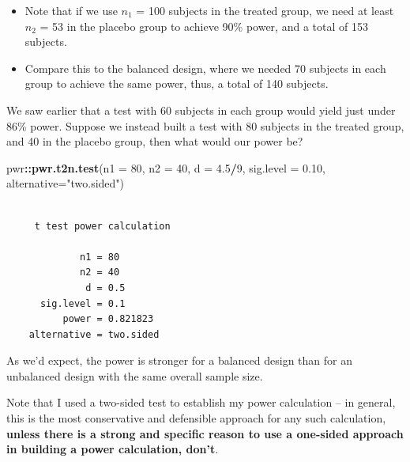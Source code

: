 \documentclass[
]{book}
\newenvironment{Shaded}{\begin{snugshade}}{\end{snugshade}}
\newcommand{\DataTypeTok}[1]{\textcolor[rgb]{0.13,0.29,0.53}{#1}}
\newcommand{\DecValTok}[1]{\textcolor[rgb]{0.00,0.00,0.81}{#1}}
\newcommand{\FloatTok}[1]{\textcolor[rgb]{0.00,0.00,0.81}{#1}}
\newcommand{\KeywordTok}[1]{\textcolor[rgb]{0.13,0.29,0.53}{\textbf{#1}}}
\newcommand{\NormalTok}[1]{#1}
\newcommand{\OperatorTok}[1]{\textcolor[rgb]{0.81,0.36,0.00}{\textbf{#1}}}
\newcommand{\StringTok}[1]{\textcolor[rgb]{0.31,0.60,0.02}{#1}}
\providecommand{\tightlist}{%
  \setlength{\itemsep}{0pt}\setlength{\parskip}{0pt}}
\begin{document}
\begin{itemize}
\tightlist
\item
  Note that if we use \(n_1\) = 100 subjects in the treated group, we need at least \(n_2\) = 53 in the placebo group to achieve 90\% power, and a total of 153 subjects.
\item
  Compare this to the balanced design, where we needed 70 subjects in each group to achieve the same power, thus, a total of 140 subjects.
\end{itemize}

We saw earlier that a test with 60 subjects in each group would yield just under 86\% power. Suppose we instead built a test with 80 subjects in the treated group, and 40 in the placebo group, then what would our power be?

\begin{Shaded}
\begin{Highlighting}[]
\NormalTok{pwr}\OperatorTok{::}\KeywordTok{pwr.t2n.test}\NormalTok{(}\DataTypeTok{n1 =} \DecValTok{80}\NormalTok{, }\DataTypeTok{n2 =} \DecValTok{40}\NormalTok{, }\DataTypeTok{d =} \FloatTok{4.5}\OperatorTok{/}\DecValTok{9}\NormalTok{, }
             \DataTypeTok{sig.level =} \FloatTok{0.10}\NormalTok{,}
             \DataTypeTok{alternative=}\StringTok{"two.sided"}\NormalTok{)}
\end{Highlighting}
\end{Shaded}

\begin{verbatim}

     t test power calculation 

             n1 = 80
             n2 = 40
              d = 0.5
      sig.level = 0.1
          power = 0.821823
    alternative = two.sided
\end{verbatim}

As we'd expect, the power is stronger for a balanced design than for an unbalanced design with the same overall sample size.

Note that I used a two-sided test to establish my power calculation -- in general, this is the most conservative and defensible approach for any such calculation, \textbf{unless there is a strong and specific reason to use a one-sided approach in building a power calculation, don't}.

  
\end{document}
